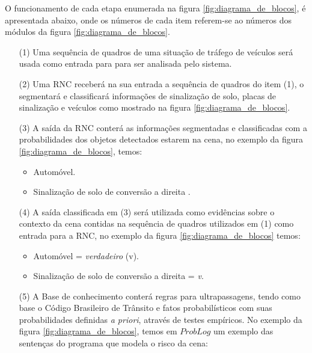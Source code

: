 \documentclass[
	12pt,				%
    oneside,			%
	a4paper,			%
	english,			%
	french,				%
	spanish,			%
	brazil,				%
	]{abntex2}
\begin{document}
O funcionamento de cada etapa enumerada na figura \ref{fig:diagrama_de_blocos}, é apresentada abaixo, onde os números de cada item referem-se ao números dos módulos da figura \ref{fig:diagrama_de_blocos}.

\begin{enumerate}
    

    \item[{(1)}] Uma sequência de quadros de uma situação de tráfego de veículos será usada como entrada para para ser analisada pelo sistema.


    \item[{(2)}] Uma RNC receberá na sua entrada a sequência de quadros do item (1), o segmentará e classificará informações de sinalização de solo, placas de sinalização e veículos como mostrado na figura \ref{fig:diagrama_de_blocos}.


    \item[{(3)}] A saída da RNC conterá as informações segmentadas e classificadas com a probabilidades dos objetos detectados estarem na cena, no exemplo da figura \ref{fig:diagrama_de_blocos}, temos:
        \begin{itemize}
            \item Automóvel.
            \item Sinalização de solo de conversão a direita . 
        \end{itemize}
        
    \item[{(4)}] A saída classificada em (3) será utilizada como evidências sobre o contexto da cena contidas na sequência de quadros utilizados em (1) como entrada para a RNC, no exemplo da figura \ref{fig:diagrama_de_blocos} temos:
        \begin{itemize}
            \item Automóvel = \textit{verdadeiro} (v).
            \item Sinalização de solo de conversão a direita  = \textit{v}.
        \end{itemize}    
        

    \item[{(5)}] A Base de conhecimento conterá regras para ultrapassagens, tendo como base o Código Brasileiro de Trânsito e fatos probabilísticos com suas probabilidades definidas \textit{a priori}, através de testes empíricos. No exemplo da figura \ref{fig:diagrama_de_blocos}, temos em $ProbLog$ um exemplo das sentenças do programa que modela o risco da cena:
        \begin{itemize}
        

\end{itemize}
\end{enumerate}
\end{document}
